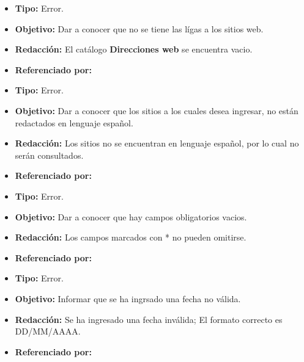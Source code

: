   
    \begin{itemize}
      \item \textbf{Tipo:} Error. 
      \item \textbf{Objetivo:}  Dar a conocer que no se tiene las lígas a los sitios web.
      \item \textbf{Redacción:} El catálogo \textbf{Direcciones web} se encuentra vacio.
      \item \textbf{Referenciado por:} \\
    \end{itemize}

    \begin{itemize}
      \item \textbf{Tipo:} Error. 
      \item \textbf{Objetivo:}  Dar a conocer que los sitios a los cuales desea ingresar, no están redactados en lenguaje español.
      \item \textbf{Redacción:} Los sitios no se encuentran en lenguaje español, por lo cual no serán consultados.
      \item \textbf{Referenciado por:} \\
    \end{itemize}

    \begin{itemize}
      \item \textbf{Tipo:} Error. 
      \item \textbf{Objetivo:}  Dar a conocer que hay campos obligatorios vacios.
      \item \textbf{Redacción:} Los campos marcados con * no pueden omitirse.
      \item \textbf{Referenciado por:} \\
    \end{itemize}

  \begin{itemize}
    \item \textbf{Tipo:} Error. 
    \item \textbf{Objetivo:}  Informar que se ha ingrsado una fecha no válida.
    \item \textbf{Redacción:} Se ha ingresado una fecha inválida; El formato correcto es DD/MM/AAAA.
    \item \textbf{Referenciado por:} \\
  \end{itemize}

